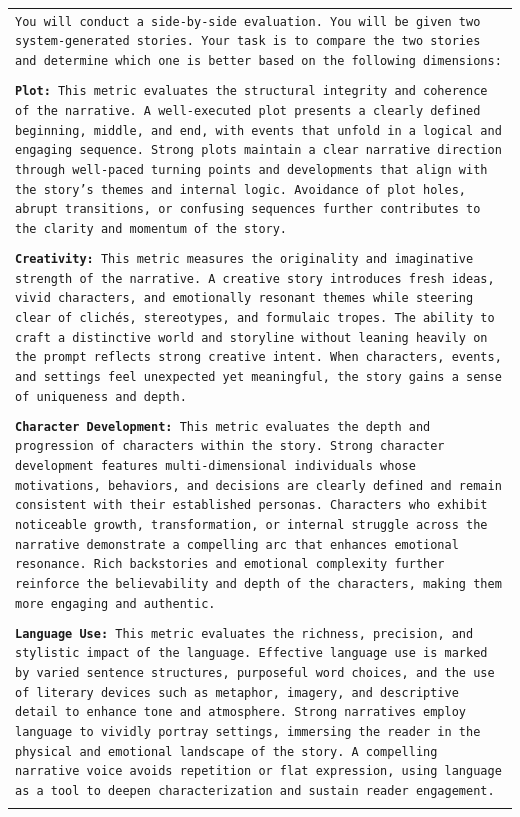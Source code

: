 \documentclass[letterpaper]{article} %
\begin{document}
\begin{table}[]
  \small
  \centering
  \begin{tabularx}{\textwidth}{X}
    \toprule
    \texttt{You will conduct a side-by-side evaluation. You will be given two system-generated stories. Your task is to compare the two stories and determine which one is better based on the following dimensions:} \\\\

    \texttt{\textbf{Plot:} This metric evaluates the structural integrity and coherence of the narrative. A well-executed plot presents a clearly defined beginning, middle, and end, with events that unfold in a logical and engaging sequence. Strong plots maintain a clear narrative direction through well-paced turning points and developments that align with the story's themes and internal logic. Avoidance of plot holes, abrupt transitions, or confusing sequences further contributes to the clarity and momentum of the story.} \\\\

    \texttt{\textbf{Creativity:} This metric measures the originality and imaginative strength of the narrative. A creative story introduces fresh ideas, vivid characters, and emotionally resonant themes while steering clear of clichés, stereotypes, and formulaic tropes. The ability to craft a distinctive world and storyline without leaning heavily on the prompt reflects strong creative intent. When characters, events, and settings feel unexpected yet meaningful, the story gains a sense of uniqueness and depth.} \\\\
    
    \texttt{\textbf{Character Development:} This metric evaluates the depth and progression of characters within the story. Strong character development features multi-dimensional individuals whose motivations, behaviors, and decisions are clearly defined and remain consistent with their established personas. Characters who exhibit noticeable growth, transformation, or internal struggle across the narrative demonstrate a compelling arc that enhances emotional resonance. Rich backstories and emotional complexity further reinforce the believability and depth of the characters, making them more engaging and authentic.} \\\\
    
    \texttt{\textbf{Language Use:} This metric evaluates the richness, precision, and stylistic impact of the language. Effective language use is marked by varied sentence structures, purposeful word choices, and the use of literary devices such as metaphor, imagery, and descriptive detail to enhance tone and atmosphere. Strong narratives employ language to vividly portray settings, immersing the reader in the physical and emotional landscape of the story. A compelling narrative voice avoids repetition or flat expression, using language as a tool to deepen characterization and sustain reader engagement.} \\\\


\end{tabularx}
\end{table}
\end{document}
